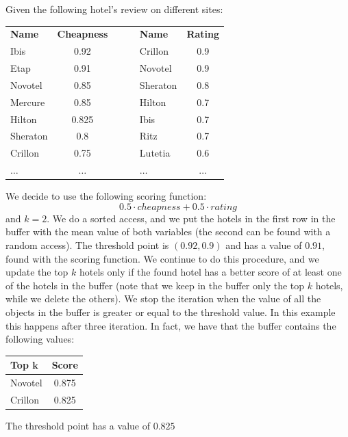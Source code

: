 \begin{example}
    Given the following hotel's review on different sites: 
    \begin{table}[H]
        \centering
        \begin{tabular}{|lc|c|lc|}
        \cline{1-2} \cline{4-5}
        \textbf{Name} & \textbf{Cheapness} & $\:\:\:\:\:\:$ & \textbf{Name} & \textbf{Rating} \\ \cline{1-2} \cline{4-5} 
        Ibis          & 0.92               &                & Crillon       & 0.9             \\ 
        Etap          & 0.91               &                & Novotel       & 0.9             \\ 
        Novotel       & 0.85               &                & Sheraton      & 0.8             \\ 
        Mercure       & 0.85               &                & Hilton        & 0.7             \\ 
        Hilton        & 0.825              &                & Ibis          & 0.7             \\ 
        Sheraton      & 0.8                &                & Ritz          & 0.7             \\ 
        Crillon       & 0.75               &                & Lutetia       & 0.6             \\ 
        $\dots$       & $\dots$            &                & $\dots$       & $\dots$         \\ \cline{1-2} \cline{4-5} 
        \end{tabular}
    \end{table}
    We decide to use the following scoring function: 
    \[0.5 \cdot cheapness+0.5 \cdot rating\]
    and $k=2$. We do a sorted access, and we put the hotels in the first row in the buffer with the mean value of both variables (the 
    second can be found with a random access). The threshold point is $(0.92,0.9)$ and has a value of $0.91$, found with the scoring 
    function. We continue to do this procedure, and we update the top $k$ hotels only if the found hotel has a better score of at least
    one of the hotels in the buffer (note that we keep in the buffer only the top $k$ hotels, while we delete the others). 
    We stop the iteration when the value of all the objects in the buffer is greater or equal to the threshold value. In this example this
    happens after three iteration. In fact, we have that the buffer contains the following values: 
    \begin{table}[H]
        \centering
        \begin{tabular}{|lc|}
        \hline
        \textbf{Top $\boldsymbol{k}$} & \textbf{Score} \\ \hline
        Novotel                       & 0.875          \\ 
        Crillon                       & 0.825          \\ \hline
        \end{tabular}
    \end{table}
    The threshold point has a value of $0.825$
\end{example}
